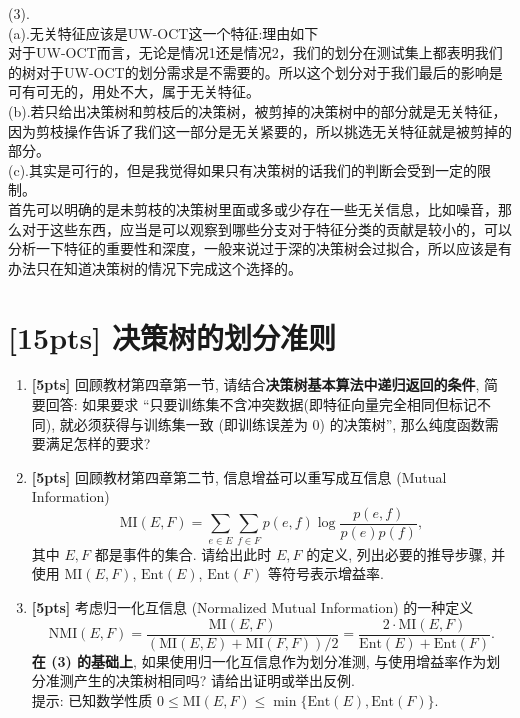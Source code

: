 \documentclass[a4paper]{article}
\numberwithin{equation}{section}
\theoremstyle{definition}
\newcommand\sbr[1]{\left( #1 \right)}
\begin{document}
    (3).\\
    (a).无关特征应该是UW-OCT这一个特征:理由如下\\
    对于UW-OCT而言，无论是情况1还是情况2，我们的划分在测试集上都表明我们的树对于UW-OCT的划分需求是不需要的。所以这个划分对于我们最后的影响是可有可无的，用处不大，属于无关特征。\\
    (b).若只给出决策树和剪枝后的决策树，被剪掉的决策树中的部分就是无关特征，因为剪枝操作告诉了我们这一部分是无关紧要的，所以挑选无关特征就是被剪掉的部分。\\
    (c).其实是可行的，但是我觉得如果只有决策树的话我们的判断会受到一定的限制。\\
    首先可以明确的是未剪枝的决策树里面或多或少存在一些无关信息，比如噪音，那么对于这些东西，应当是可以观察到哪些分支对于特征分类的贡献是较小的，可以分析一下特征的重要性和深度，一般来说过于深的决策树会过拟合，所以应该是有办法只在知道决策树的情况下完成这个选择的。
\newpage

\section{[15pts] 决策树的划分准则}

\begin{enumerate}
	\item[(1)] \textbf{[5pts]} 回顾教材第四章第一节, 请结合\textbf{决策树基本算法中递归返回的条件}, 简要回答: 如果要求 ``只要训练集不含冲突数据(即特征向量完全相同但标记不同), 就必须获得与训练集一致 (即训练误差为 $0$) 的决策树'', 那么纯度函数需要满足怎样的要求?
	\item[(2)] \textbf{[5pts]} 回顾教材第四章第二节, 信息增益可以重写成互信息 (Mutual Information)
	      $$\mathrm{MI}(E,F) = \sum_{e \in E} \sum_{f \in F} p(e,f) \log \frac{p(e,f)}{p(e)p(f)},$$
	      其中 $E,F$ 都是事件的集合. 请给出此时 $E,F$ 的定义, 列出必要的推导步骤, 并使用 $\mathrm{MI}(E,F)$, $\mathrm{Ent}(E)$, $\mathrm{Ent}(F)$ 等符号表示增益率.
	\item[(3)] \textbf{[5pts]} 考虑归一化互信息 (Normalized Mutual Information) 的一种定义
	      $$\mathrm{NMI}(E,F) = \frac{\mathrm{MI}(E,F)}{\sbr{\mathrm{MI}(E,E) + \mathrm{MI}(F,F)} / 2} = \frac{2 \cdot \mathrm{MI}(E,F)}{\mathrm{Ent}(E) + \mathrm{Ent}(F)}.$$
	      \textbf{在 (3) 的基础上}, 如果使用归一化互信息作为划分准测, 与使用增益率作为划分准测产生的决策树相同吗? 请给出证明或举出反例. \\
	      提示: 已知数学性质 $0 \leqslant \mathrm{MI}(E,F) \leqslant \min\{\mathrm{Ent}(E), \mathrm{Ent}(F)\}$.
\end{enumerate}
\end{document}
